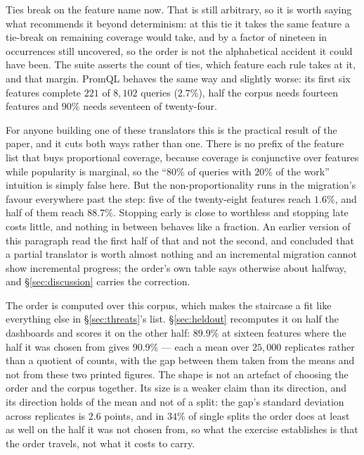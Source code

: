 Ties break on the feature name now. That is still arbitrary, so it is worth saying what
recommends it beyond determinism: at this tie it takes the same feature a tie-break on
remaining coverage would take, and by a factor of nineteen in occurrences still
uncovered, so the order is not the alphabetical accident it could have been. The suite
asserts the count of ties, which feature each rule takes at it, and that margin. PromQL behaves the same way
and slightly worse: its first six features complete $221$ of $8{,}102$ queries
($2.7\%$), half the corpus needs fourteen features and $90\%$ needs seventeen of
twenty-four.

For anyone building one of these translators this is the practical result of the paper,
and it cuts both ways rather than one. There is no prefix of the feature list that buys
proportional coverage, because coverage is conjunctive over features while popularity is
marginal, so the ``$80\%$ of queries with $20\%$ of the work'' intuition is simply false
here. But the non-proportionality runs in the migration's favour everywhere past the
step: five of the twenty-eight features reach $1.6\%$, and half of them reach $88.7\%$.
Stopping early is close to worthless and stopping late costs little, and nothing in
between behaves like a fraction. An earlier version of this paragraph read the first
half of that and not the second, and concluded that a partial translator is worth almost
nothing and an incremental migration cannot show incremental progress; the order's own
table says otherwise about halfway, and \S\ref{sec:discussion} carries the correction.

The order is computed over this corpus, which makes the staircase a fit like everything
else in \S\ref{sec:threats}'s list. \S\ref{sec:heldout} recomputes it on half the
dashboards and scores it on the other half: $89.9\%$ at sixteen features where the half
it was chosen from gives $90.9\%$ --- each a mean over $25{,}000$ replicates rather than
a quotient of counts, with the gap between them taken from the means and not from these
two printed figures. The shape is not an artefact of choosing the order and the corpus
together. Its size is a weaker claim than its direction, and its direction holds of the
mean and not of a split: the gap's standard deviation across replicates is $2.6$ points,
and in $34\%$ of single splits the order does at least as well on the half it was not
chosen from, so what the exercise establishes is that the order travels, not what it
costs to carry.

